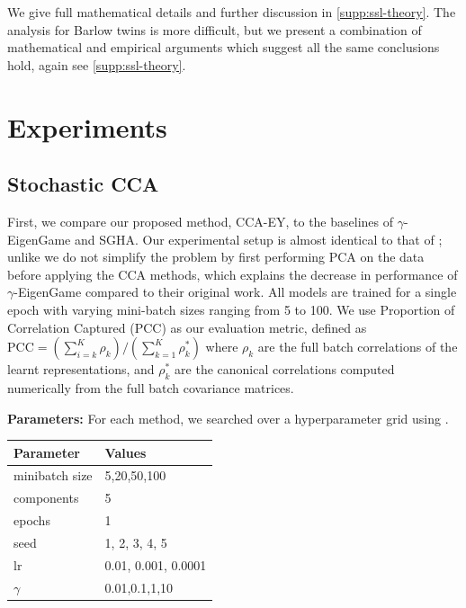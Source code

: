 We give full mathematical details and further discussion in \cref{supp:ssl-theory}.
The analysis for Barlow twins is more difficult, but we present a combination of mathematical and empirical arguments which suggest all the same conclusions hold, again see \cref{supp:ssl-theory}.

\section{Experiments}\label{Experiments}


\subsection{Stochastic CCA}
First, we compare our proposed method, CCA-EY, to the baselines of $\gamma$-EigenGame and SGHA.
Our experimental setup is almost identical to that of \cite{meng2021online, gemp2022generalized}; unlike \cite{gemp2022generalized} we do not simplify the problem by first performing PCA on the data before applying the CCA methods, which explains the decrease in performance of $\gamma$-EigenGame compared to their original work.
All models are trained for a single epoch with varying mini-batch sizes ranging from 5 to 100. We use Proportion of Correlation Captured (PCC) as our evaluation metric, defined as \( \text{PCC} = (\sum_{i=k}^K \rho_k)/ ({\sum_{k=1}^K \rho_k^*}) \) where $\rho_k$ are the full batch correlations of the learnt representations, and $\rho_k^*$ are the canonical correlations computed numerically from the full batch covariance matrices.

\textbf{Parameters:} For each method, we searched over a hyperparameter grid using \citet{wandb}.

\begin{table}[h!]
    \centering
    \begin{tabular}{|l|l|}
        \hline Parameter             & Values              \\
        \hline minibatch size        & 5,20,50,100         \\
        \hline components            & 5                   \\
        \hline epochs                & 1                   \\
        \hline seed                  & 1, 2, 3, 4, 5       \\
        \hline lr                    & 0.01, 0.001, 0.0001 \\
        \hline $\gamma$\footnotemark & 0.01,0.1,1,10       \\
        \hline
    \end{tabular}
\end{table}

